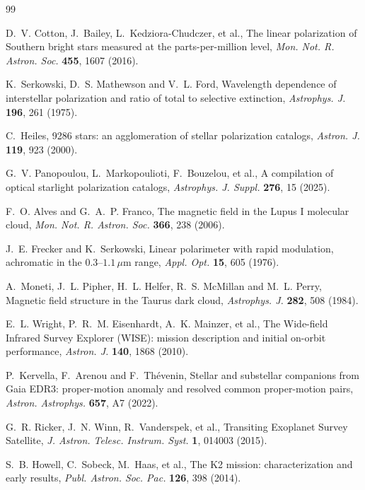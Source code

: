 \documentclass[3p,11pt]{elsarticle}
\begin{document}
\begin{thebibliography}{99}\small\raggedright
\setlength{\itemsep}{1pt}

D.~V. Cotton, J.~Bailey, L.~Kedziora-Chudczer, et al., The linear polarization of
Southern bright stars measured at the parts-per-million level, \emph{Mon. Not. R. Astron.
Soc.} \textbf{455}, 1607 (2016).

K.~Serkowski, D.~S. Mathewson and V.~L. Ford, Wavelength dependence of interstellar
polarization and ratio of total to selective extinction, \emph{Astrophys. J.}
\textbf{196}, 261 (1975).

C.~Heiles, 9286 stars: an agglomeration of stellar polarization catalogs, \emph{Astron.
J.} \textbf{119}, 923 (2000).

G.~V. Panopoulou, L.~Markopoulioti, F.~Bouzelou, et al., A compilation of optical
starlight polarization catalogs, \emph{Astrophys. J. Suppl.} \textbf{276}, 15 (2025).

F.~O. Alves and G.~A.~P. Franco, The magnetic field in the Lupus I molecular cloud,
\emph{Mon. Not. R. Astron. Soc.} \textbf{366}, 238 (2006).

J.~E. Frecker and K.~Serkowski, Linear polarimeter with rapid modulation, achromatic in
the $0.3$--$1.1$\,$\mu$m range, \emph{Appl. Opt.} \textbf{15}, 605 (1976).

A.~Moneti, J.~L. Pipher, H.~L. Helfer, R.~S. McMillan and M.~L. Perry, Magnetic field
structure in the Taurus dark cloud, \emph{Astrophys. J.} \textbf{282}, 508 (1984).

E.~L. Wright, P.~R.~M. Eisenhardt, A.~K. Mainzer, et al., The Wide-field Infrared Survey
Explorer (WISE): mission description and initial on-orbit performance, \emph{Astron. J.}
\textbf{140}, 1868 (2010).

P.~Kervella, F.~Arenou and F.~Th\'evenin, Stellar and substellar companions from Gaia
EDR3: proper-motion anomaly and resolved common proper-motion pairs, \emph{Astron.
Astrophys.} \textbf{657}, A7 (2022).

G.~R. Ricker, J.~N. Winn, R.~Vanderspek, et al., Transiting Exoplanet Survey Satellite,
\emph{J. Astron. Telesc. Instrum. Syst.} \textbf{1}, 014003 (2015).

S.~B. Howell, C.~Sobeck, M.~Haas, et al., The K2 mission: characterization and early
results, \emph{Publ. Astron. Soc. Pac.} \textbf{126}, 398 (2014).


\end{thebibliography}
\end{document}
